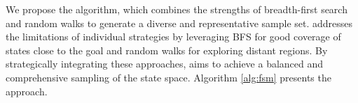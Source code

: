We propose the \bfsrw algorithm, which combines the strengths of breadth-first search and random walks to generate a diverse and representative sample set. \bfsrw addresses the limitations of individual strategies by leveraging BFS for good coverage of states close to the goal and random walks for exploring distant regions. By strategically integrating these approaches, \bfsrw aims to achieve a balanced and comprehensive sampling of the state space. Algorithm \ref{alg:fsm} presents the approach.

\begin{algorithm}[ht]
    \SetAlgoLined



\end{algorithm}

